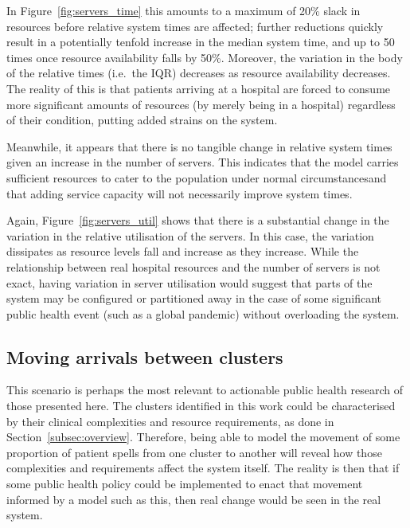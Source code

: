 In Figure~\ref{fig:servers_time} this amounts to a maximum of 20\% slack in
resources before relative system times are affected; further reductions quickly
result in a potentially tenfold increase in the median system time, and up to 50
times once resource availability falls by 50\%. Moreover, the variation in the
body of the relative times (i.e.\ the IQR) decreases as resource availability
decreases. The reality of this is that patients arriving at a hospital are
forced to consume more significant amounts of resources (by merely being in a
hospital) regardless of their condition, putting added strains on the system.

Meanwhile, it appears that there is no tangible change in relative system times
given an increase in the number of servers. This indicates that the model
carries sufficient resources to cater to the population under normal
circumstancesand that adding service capacity will not necessarily improve
system times.

Again, Figure~\ref{fig:servers_util} shows that there is a substantial change in
the variation in the relative utilisation of the servers. In this case, the
variation dissipates as resource levels fall and increase as they increase.
While the relationship between real hospital resources and the number of servers
is not exact, having variation in server utilisation would suggest that parts of
the system may be configured or partitioned away in the case of some significant
public health event (such as a global pandemic) without overloading the system.


\subsection{Moving arrivals between clusters}\label{subsec:moving}

This scenario is perhaps the most relevant to actionable public health research
of those presented here. The clusters identified in this work could be
characterised by their clinical complexities and resource requirements, as done
in Section~\ref{subsec:overview}. Therefore, being able to model the movement of
some proportion of patient spells from one cluster to another will reveal how
those complexities and requirements affect the system itself. The reality is
then that if some public health policy could be implemented to enact that
movement informed by a model such as this, then real change would be seen in the
real system.

